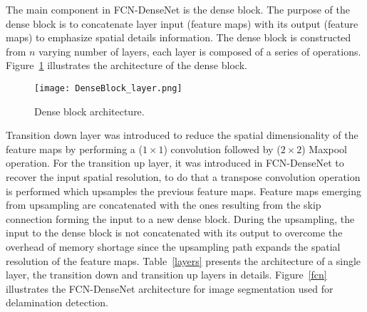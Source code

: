 The main component in FCN-DenseNet is the dense block.
The purpose of the dense block is to concatenate layer input (feature maps) with its output (feature maps) to emphasize spatial details information.
The dense block is constructed from \(n\) varying number of layers, each layer is composed of a series of operations.
Figure~\ref{dense_block} illustrates the architecture of the dense block.
\begin{figure} [h!]
	\begin{center}
		\texttt{[image: DenseBlock\_layer.png]}
	\end{center}
	\caption{Dense block architecture.} 
	\label{dense_block}
\end{figure}
Transition down layer was introduced to reduce the spatial dimensionality of the feature maps by performing a (\(1\times 1\)) convolution followed by (\(2\times2\)) Maxpool operation. 
For the transition up layer, it was introduced in FCN-DenseNet to recover the input spatial resolution, to do that a transpose convolution operation is performed which upsamples the previous feature maps.
Feature maps emerging from upsampling are concatenated with the ones resulting from the skip connection forming the input to a new dense block.
During the upsampling, the input to the dense block is not concatenated with its output to overcome the overhead of memory shortage since the upsampling path expands the spatial resolution of the feature maps.
Table~\ref{layers} presents the architecture of a single layer, the transition down  and transition up layers in details.
Figure~\ref{fcn} illustrates the FCN-DenseNet architecture for image segmentation used for delamination detection.
